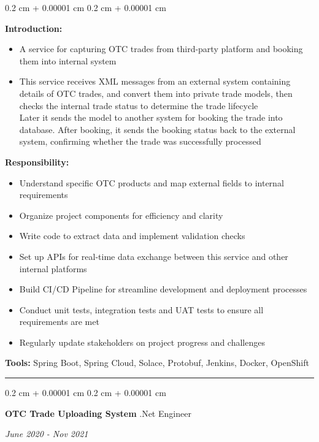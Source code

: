 \documentclass[10pt, letterpaper]{article}
\newenvironment{highlights}{
	\begin{itemize}[
		topsep=0.10 cm,
		parsep=0.10 cm,
		partopsep=0pt,
		itemsep=0pt,
		leftmargin=0.4 cm + 10pt
		]
	}{
	\end{itemize}
} %
\newenvironment{onecolentry}{
	\begin{adjustwidth}{
			0.2 cm + 0.00001 cm
		}{
			0.2 cm + 0.00001 cm
		}
	}{
	\end{adjustwidth}
} %
\newenvironment{twocolentry}[2][]{
	\onecolentry
	\def\secondColumn{#2}
	\setcolumnwidth{\fill, 4.5 cm}
	\begin{paracol}{2}
	}{
		\switchcolumn \raggedleft \secondColumn
	\end{paracol}
	\endonecolentry
} %
\begin{document}
			\vspace{0.10 cm}
			\begin{onecolentry}
				\textbf{Introduction:} 
				\begin{highlights}
					\item A service for capturing OTC trades from third-party platform and booking them into internal system
					\item This service receives XML messages from an external system containing details of OTC trades, and convert them into private trade models, then checks the internal trade status to determine the trade lifecycle
					\\Later it sends the model to another system for booking the trade into database. After booking, it sends the booking status back to the external system, confirming whether the trade was successfully processed
				\end{highlights}
				\textbf{Responsibility:} 
				\begin{highlights}
					\item Understand specific OTC products and map external fields to internal requirements
					\item Organize project components for efficiency and clarity
					\item Write code to extract data and implement validation checks
					\item Set up APIs for real-time data exchange between this service and other internal platforms
					\item Build CI/CD Pipeline for streamline development and deployment processes
					\item Conduct unit tests, integration tests and UAT tests to ensure all requirements are met
					\item Regularly update stakeholders on project progress and challenges
				\end{highlights}
				\textbf{Tools:} Spring Boot, Spring Cloud, Solace, Protobuf, Jenkins, Docker, OpenShift
			\end{onecolentry}
			\vspace{0.4 cm}
			\hrule
			\vspace{0.4 cm}
			\begin{twocolentry}{	
				\textit{June 2020 - Nov 2021}}
				\textbf{OTC Trade Uploading System}
				\space\space\space\space\space\space\space\space\space\space\space\space .Net Engineer
			\end{twocolentry}
			
\end{document}
